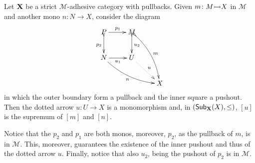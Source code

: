\begin{proposition}\label{prop:uni2} Let $\textbf {\textup{X}}$ be a strict $\mathcal{M}$-adhesive category with pullbacks. Given  $m\colon M\mto X$ in $\mathcal{M}$  and another mono $n\colon N\to X$, consider the diagram 
	\[\xymatrix{P \ar[r]^{p_1} \ar@{>->}[d]_{p_2} & M\ar@{>->}[d]^{u_2} \ar@{>->}@/^.3cm/[ddr]^{m} \\ N \ar@/_.3cm/[drr]_{n}\ar[r]_{u_1} & U \ar@{.>}[dr]^{u} \\ && X}\]
	in which the outer boundary form a pullback and the inner square a pushout. Then the dotted arrow $u\colon U\to X$ is a monomorphism and, in $(\mathsf{Sub}_{\textbf {\textup{X}}}(X), \leq)$, $[u]$ is the supremum of $[m]$ and $[n]$.  
\end{proposition}
\begin{remark}
	Notice that the  $p_2$ and $p_1$ are both monos, moreover, $p_2$, as the pullback of $m$, is in $\mathcal{M}$. This, moreover, guarantees the existence of the inner pushout and thus of the dotted arrow $u$.  Finally, notice that also $u_2$, being the pushout of $p_2$ is in $\mathcal{M}$.
\end{remark}
